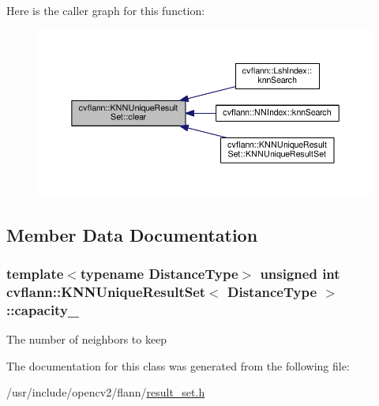 Here is the caller graph for this function\-:\nopagebreak
\begin{figure}[H]
\begin{center}
\leavevmode
\includegraphics[width=350pt]{classcvflann_1_1KNNUniqueResultSet_afcf19c6a201b4580983b6baaae0a8383_icgraph}
\end{center}
\end{figure}




\subsection{Member Data Documentation}
\hypertarget{classcvflann_1_1KNNUniqueResultSet_ab29fdc339d19bb704764ad2a1fa22e80}{
\subsubsection[{capacity\-\_\-}]{\setlength{\rightskip}{0pt plus 5cm}template$<$typename Distance\-Type$>$ unsigned int {\bf cvflann\-::\-K\-N\-N\-Unique\-Result\-Set}$<$ Distance\-Type $>$\-::capacity\-\_\-\hspace{0.3cm}{\ttfamily [protected]}}}\label{classcvflann_1_1KNNUniqueResultSet_ab29fdc339d19bb704764ad2a1fa22e80}
The number of neighbors to keep 

The documentation for this class was generated from the following file\-:\begin{DoxyCompactItemize}
\item 
/usr/include/opencv2/flann/\hyperlink{result__set_8h}{result\-\_\-set.\-h}\end{DoxyCompactItemize}
